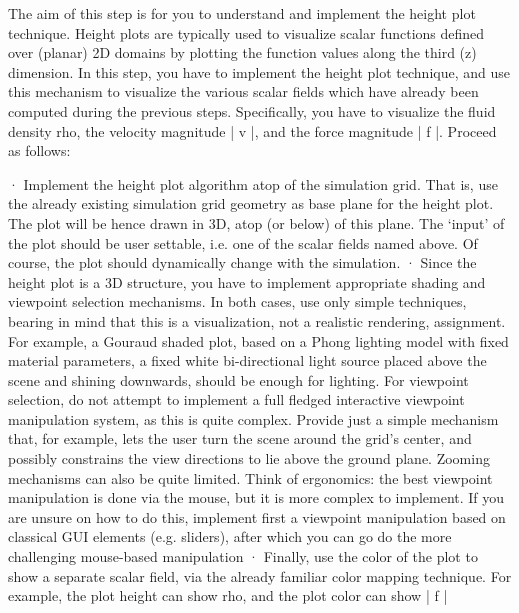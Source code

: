 
The aim of this step is for you to understand and implement the height plot technique. Height plots are typically used to visualize scalar functions defined over (planar) 2D domains by plotting the function values along the third (z) dimension. In this step, you have to implement the height plot technique, and use this mechanism to visualize the various scalar fields which have already been computed during the previous steps. Specifically, you have to visualize the fluid density rho, the velocity magnitude | v |, and the force magnitude | f |. Proceed as follows:
 
·        Implement the height plot algorithm atop of the simulation grid. That is, use the already existing simulation grid geometry as base plane for the height plot. The plot will be hence drawn in 3D, atop (or below) of this plane. The ‘input’ of the plot should be user settable, i.e. one of the scalar fields named above. Of course, the plot should dynamically change with the simulation.
·        Since the height plot is a 3D structure, you have to implement appropriate shading and viewpoint selection mechanisms. In both cases, use only simple techniques, bearing in mind that this is a visualization, not a realistic rendering, assignment. For example, a Gouraud shaded plot, based on a Phong lighting model with fixed material parameters, a fixed white bi-directional light source placed above the scene and shining downwards, should be enough for lighting. For viewpoint selection, do not attempt to implement a full fledged interactive viewpoint manipulation system, as this is quite complex. Provide just a simple mechanism that, for example, lets the user turn the scene around the grid’s center, and possibly constrains the view directions to lie above the ground plane. Zooming mechanisms can also be quite limited. Think of ergonomics: the best viewpoint manipulation is done via the mouse, but it is more complex to implement. If you are unsure on how to do this, implement first a viewpoint manipulation based on classical GUI elements (e.g. sliders), after which you can go do the more challenging mouse-based manipulation
·        Finally, use the color of the plot to show a separate scalar field, via the already familiar color mapping technique. For example, the plot height can show rho, and the plot color can show | f |

